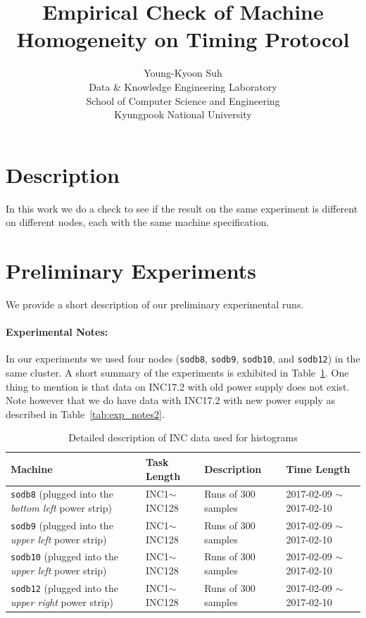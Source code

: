 \documentclass[10pt]{article}
\begin{document}
\title{Empirical Check of Machine Homogeneity on Timing Protocol}

\author{
Young-Kyoon Suh\\
Data \& Knowledge Engineering Laboratory\\
School of Computer Science and Engineering\\
Kyungpook National University\\
}
\maketitle

\section{Description}
In this work we do a check to see if the result on the same experiment is different 
on different nodes, each with the same machine specification.

\section{Preliminary Experiments}

We provide a short description of our preliminary experimental runs. 

\paragraph{Experimental Notes:} In our experiments 
we used four nodes ({\tt sodb8}, {\tt sodb9}, {\tt sodb10}, and {\tt sodb12}) in the same cluster. 
A short summary of the experiments is exhibited in Table~\ref{tab:exp_notes}.
One thing to mention is that data on INC17.2 with old power supply does not exist. 
Note however that we do have data with INC17.2 with new power supply as described in Table~\ref{tab:exp_notes2}.

\begin{table}[h]
\begin{center}
\begin{tabular}{|p{4cm}|p{3cm}|p{4cm}|p{4cm}|} \hline
Machine & Task Length & Description & Time Length\\ \hline
{\tt sodb8} (plugged into the {\em bottom left} power strip) & INC1$\sim$INC128 & Runs of 300 samples & 2017-02-09 $\sim$ 2017-02-10\\ \hline
{\tt sodb9}  (plugged into the {\em upper left} power strip)  &  INC1$\sim$INC128 & Runs of 300 samples & 2017-02-09 $\sim$ 2017-02-10\\ \hline
{\tt sodb10}  (plugged into the {\em upper left} power strip)  & INC1$\sim$INC128 & Runs of 300 samples & 2017-02-09 $\sim$ 2017-02-10\\ \hline
{\tt sodb12}  (plugged into the {\em upper right} power strip)  & INC1$\sim$INC128 & Runs of 300 samples & 2017-02-09 $\sim$ 2017-02-10\\ \hline
\end{tabular}
\end{center}
\vspace{-.2in}
\caption{Detailed description of INC data used for histograms\label{tab:exp_notes}}
\end{table}
\end{document}
